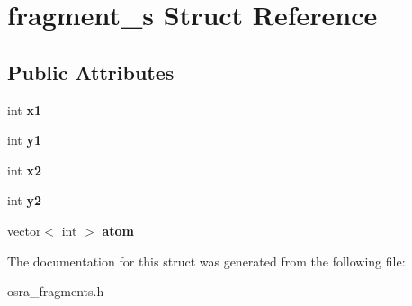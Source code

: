 \hypertarget{structfragment__s}{\section{fragment\-\_\-s Struct Reference}
\label{structfragment__s}
}
\subsection*{Public Attributes}
\begin{DoxyCompactItemize}
\item 
\hypertarget{structfragment__s_ac60435f55ec593f4a65035aac71c2da9}{int {\bfseries x1}}\label{structfragment__s_ac60435f55ec593f4a65035aac71c2da9}

\item 
\hypertarget{structfragment__s_a6dc52321d8215d6eda38c8aded1b5530}{int {\bfseries y1}}\label{structfragment__s_a6dc52321d8215d6eda38c8aded1b5530}

\item 
\hypertarget{structfragment__s_a78a881ff530bd9f5cb5bed18d3319159}{int {\bfseries x2}}\label{structfragment__s_a78a881ff530bd9f5cb5bed18d3319159}

\item 
\hypertarget{structfragment__s_a96ef3ef3006bc1cf8b013dcdd2f52580}{int {\bfseries y2}}\label{structfragment__s_a96ef3ef3006bc1cf8b013dcdd2f52580}

\item 
\hypertarget{structfragment__s_a703c8e83ed0c7c7c142459ffd454dcc9}{vector$<$ int $>$ {\bfseries atom}}\label{structfragment__s_a703c8e83ed0c7c7c142459ffd454dcc9}

\end{DoxyCompactItemize}


The documentation for this struct was generated from the following file\-:\begin{DoxyCompactItemize}
\item 
osra\-\_\-fragments.\-h\end{DoxyCompactItemize}
